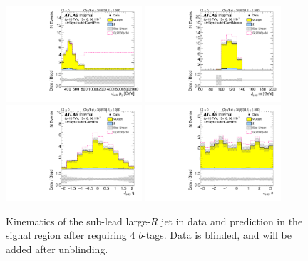 \begin{figure}[htbp!]
\begin{center}
\includegraphics[width=0.45\textwidth,angle=-90]{figures/boosted/Signal/b77_FourTag_Signal_sublHCand_Pt_m_blind.pdf}
\includegraphics[width=0.45\textwidth,angle=-90]{figures/boosted/Signal/b77_FourTag_Signal_sublHCand_Mass_s_blind.pdf}\\
\includegraphics[width=0.45\textwidth,angle=-90]{figures/boosted/Signal/b77_FourTag_Signal_sublHCand_Eta_blind.pdf}
\includegraphics[width=0.45\textwidth,angle=-90]{figures/boosted/Signal/b77_FourTag_Signal_sublHCand_Phi_blind.pdf}
  \caption{Kinematics of the sub-lead large-$R$ jet in data and prediction in the signal region after requiring 4 $b$-tags. Data is blinded, and will be added after unblinding.}
  \label{fig:boosted-4b-signal-blind-ak10-subl}
\end{center}
\end{figure}

